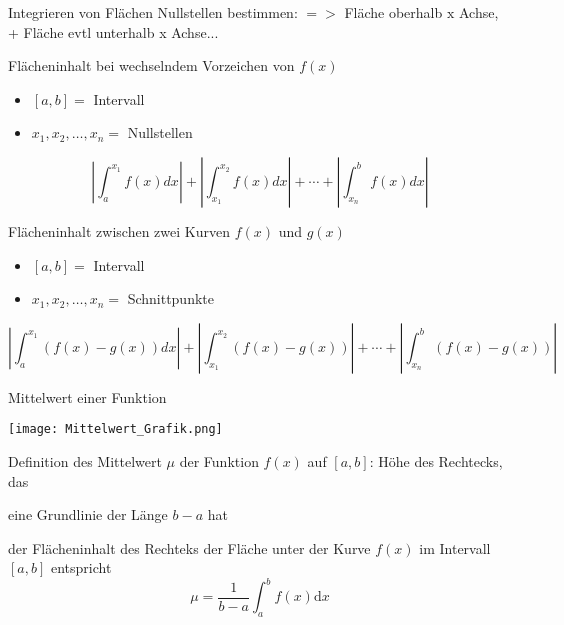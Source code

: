 \begin{KR}{Integrieren von Flächen}
    Nullstellen bestimmen: $=>$ Fläche oberhalb $\mathrm{x}$ Achse, + Fläche evtl unterhalb x Achse...
    \end{KR}

\begin{KR}{Flächeninhalt bei wechselndem Vorzeichen von $f(x)$}\\
	\begin{itemize}
	  \item $[a, b]=$ Intervall
	  \item $x_{1}, x_{2}, \ldots, x_{n}=$ Nullstellen
	\end{itemize}
	
	$$\left|\int_{a}^{x_{1}} f(x) d x\right|+\left|\int_{x_{1}}^{x_{2}} f(x) d x\right|+\cdots+\left|\int_{x_{n}}^{b} f(x) d x\right|$$
	\end{KR}

	\begin{KR}{Flächeninhalt zwischen zwei Kurven $f(x)$ und $g(x)$}\\
		\begin{itemize}
		  \item $[a, b]=$ Intervall
		  \item $x_{1}, x_{2}, \ldots, x_{n}=$ Schnittpunkte
		\end{itemize}
		$$\left|\int_{a}^{x_{1}}(f(x)-g(x)) d x\right|+\left|\int_{x_{1}}^{x_{2}}(f(x)-g(x))\right|+\cdots+\left|\int_{x_{n}}^{b}(f(x)-g(x))\right|$$
		\end{KR}


\begin{theorem}{Mittelwert einer Funktion}\\
    \begin{center} %
    \texttt{[image: Mittelwert\_Grafik.png]}
    \end{center}
  Definition des Mittelwert \(\mu\) der Funktion \(f(x)\) auf \([a,b]\): Höhe des Rechtecks, das
  \itemize
    \item eine Grundlinie der Länge \(b-a\) hat
    \item der Flächeninhalt des Rechteks der Fläche unter der Kurve \(f(x)\) im Intervall \([a,b]\) entspricht
	\[\mu = \frac{1}{b-a}\int_a^b{f(x)\mathrm{d}x} \]
\end{theorem}


